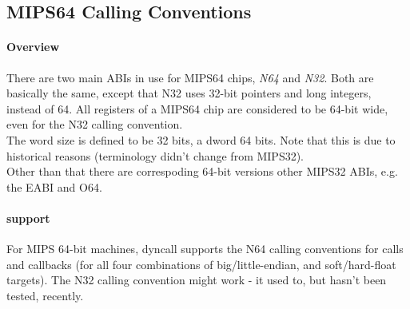 %
%
%
%

\subsection{MIPS64 Calling Conventions}

\paragraph{Overview}

There are two main ABIs in use for MIPS64 chips, \emph{N64}\cite{MIPSn32/n64} and \emph{N32}\cite{MIPSn32/n64}. Both are
basically the same, except that N32 uses 32-bit pointers and long integers, instead of 64. All registers of a MIPS64 chip are considered
to be 64-bit wide, even for the N32 calling convention.\\
The word size is defined to be 32 bits, a dword 64 bits. Note that this is due to historical reasons (terminology didn't change from MIPS32).\\
Other than that there are correspoding 64-bit versions other MIPS32 ABIs, e.g. the EABI\cite{MIPSeabi} and O64\cite{MIPSo64}.

\paragraph{ support}

For MIPS 64-bit machines, dyncall supports the N64 calling conventions for calls and callbacks (for all four combinations of big/little-endian, and soft/hard-float targets).
The N32 calling convention might work - it used to, but hasn't been tested, recently.


